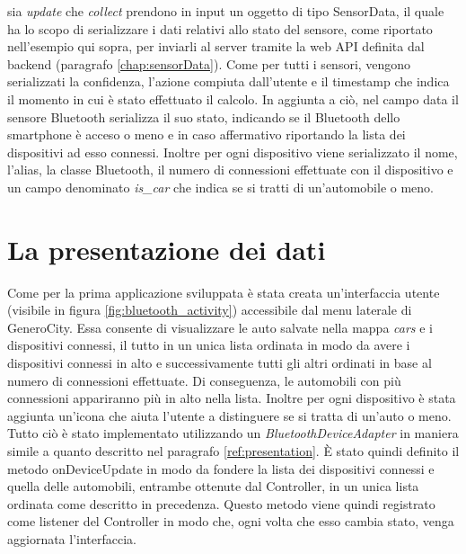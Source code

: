 sia \textit{update} che \textit{collect} prendono in input un oggetto di tipo SensorData, il quale ha lo scopo di serializzare i dati relativi allo stato del sensore, come riportato nell'esempio qui sopra, per inviarli al server tramite la web API definita dal backend (paragrafo \ref{chap:sensorData}). Come per tutti i sensori, vengono serializzati la confidenza, l'azione compiuta dall'utente e il timestamp che indica il momento in cui è stato effettuato il calcolo. In aggiunta a ciò, nel campo data il sensore Bluetooth serializza il suo stato, indicando se il Bluetooth dello smartphone è acceso o meno e in caso affermativo riportando la lista dei dispositivi ad esso connessi. Inoltre per ogni dispositivo viene serializzato il nome, l'alias, la classe Bluetooth, il numero di connessioni effettuate con il dispositivo e un campo denominato \textit{is\_car} che indica se si tratti di un'automobile o meno.

\section{La presentazione dei dati}
Come per la prima applicazione sviluppata è stata creata un'interfaccia utente (visibile in figura \ref{fig:bluetooth_activity}) accessibile dal menu laterale di GeneroCity. Essa consente di visualizzare le auto salvate nella mappa \textit{cars} e i dispositivi connessi, il tutto in un unica lista ordinata in modo da avere i dispositivi connessi in alto e successivamente tutti gli altri ordinati in base al numero di connessioni effettuate. Di conseguenza, le automobili con più connessioni appariranno più in alto nella lista. Inoltre per ogni dispositivo è stata aggiunta un'icona che aiuta l'utente a distinguere se si tratta di un'auto o meno. Tutto ciò è stato implementato utilizzando un \textit{BluetoothDeviceAdapter} in maniera simile a quanto descritto nel paragrafo \ref{ref:presentation}. È stato quindi definito il metodo onDeviceUpdate in modo da fondere la lista dei dispositivi connessi e quella delle automobili, entrambe ottenute dal Controller, in un unica lista ordinata come descritto in precedenza. Questo metodo viene quindi registrato come listener del Controller in modo che, ogni volta che esso cambia stato, venga aggiornata l'interfaccia.

